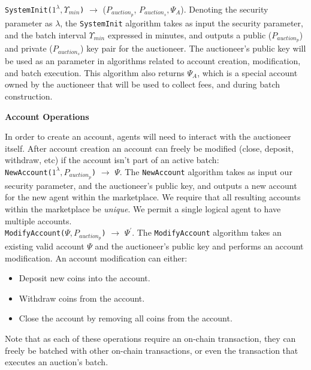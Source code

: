 \documentclass[12pt,a4paper]{article}
\theoremstyle{definition}
\begin{document}
\texttt{SystemInit($1^{\lambda}, \Upsilon_{min}$)} $\rightarrow$ ($P_{auction_p}$,
$P_{auction_s}, \Psi_{A}$). Denoting the security parameter as $\lambda$, the
    \texttt{SystemInit} algorithm takes as input the security parameter, and
    the batch interval $\Upsilon_{min}$ expressed in minutes, and outputs a
    public ($P_{auction_p}$) and private ($P_{auction_s}$) key pair for the
    auctioneer. The auctioneer's public key will be used as an parameter in
    algorithms related to account creation, modification, and batch execution.
    This algorithm also returns $\Psi_{A}$, which is a special account owned by
    the auctioneer that will be used to collect fees, and during batch
    construction.

\begin{center}
    \textbf{Account Operations}
\end{center}

In order to create an account, agents will need to interact with the auctioneer
itself. After account creation an account can freely be modified (close,
deposit, withdraw, etc) if the account isn't part of an active batch: \\

\texttt{NewAccount($1^{\lambda}, P_{auction_p}$)} $\rightarrow$ $\Psi$. The
\texttt{NewAccount} algorithm takes as input our security parameter, and the
auctioneer's public key, and outputs a new account for the new agent within the
marketplace. We require that all resulting accounts within the marketplace be
\emph{unique}. We permit a single logical agent to have multiple accounts. \\

\texttt{ModifyAccount($\Psi, P_{auction_p}$)} $\rightarrow$ $\Psi^\prime$. The %
\texttt{ModifyAccount} algorithm takes an existing valid account $\Psi$ and the
auctioneer's public key and performs an account modification. An account
modification can either:
\begin{itemize}
    \item Deposit new coins into the account.
    \item Withdraw coins from the account.
    \item Close the account by removing all coins from the account.
\end{itemize}

Note that as each of these operations require an on-chain transaction, they can
freely be batched with other on-chain transactions, or even the transaction that
executes an auction's batch.
\end{document}
